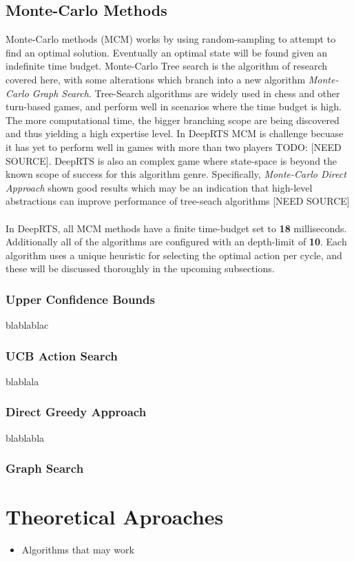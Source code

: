 \documentclass[fleqn,10pt]{article} %
\newcommand{\todo}[1]{}
\renewcommand{\todo}[1]{{\color{red} TODO: {#1}}}
\begin{document}
\subsection{Monte-Carlo Methods}
Monte-Carlo methods (MCM) works by using random-sampling to attempt to find an optimal solution. Eventually an optimal state will be found given an indefinite time budget. Monte-Carlo Tree search is the algorithm of research covered here, with some alterations which branch into a new algorithm \textit{Monte-Carlo Graph Search}.
Tree-Search algorithms are widely used in chess and other turn-based games, and perform well in scenarios where the time budget is high. The more computational time, the bigger branching scope are being discovered and thus yielding a high expertise level.
In DeepRTS MCM is challenge becuase it has yet to perform well in games with more than two players \todo{[NEED SOURCE]}. DeepRTS is also an complex game where state-space is beyond the known scope of success for this algorithm genre. Specifically, \textit{Monte-Carlo Direct Approach} shown good results which may be an indication that high-level abstractions can improve performance of tree-seach algorithms [NEED SOURCE]
\\
\\
In DeepRTS, all MCM methods have a finite time-budget set to \textbf{18} milliseconds. Additionally all of the algorithms are configured with an depth-limit of \textbf{10}. 
Each algorithm uses a unique heuristic for selecting the optimal action per cycle, and these will be discussed thoroughly in the upcoming subsections.
\subsubsection*{Upper Confidence Bounds}
blablablac

\subsubsection*{UCB Action Search}
blablala

\subsubsection*{Direct Greedy Approach}
blablabla

\subsubsection*{Graph Search}

\section{Theoretical Aproaches}
\begin{itemize}
    \item Algorithms that may work
\end{itemize}
\end{document}
